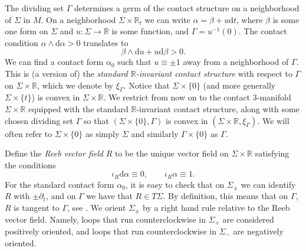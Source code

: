 \documentclass[11pt]{amsart}
\theoremstyle{mystyle}
\newcommand{\R}{\mathbb{R}}
\newcommand{\de}{\text{d}}
\newcommand{\<}{\langle}
\renewcommand{\>}{\rangle}
\begin{document}
    The dividing set $\Gamma$ determines a germ of the contact structure on a neighborhood of $\Sigma$ in $M$. On a neighborhood $\Sigma\times \R_t$ we can write $\alpha = \beta+u\de t$, where $\beta$ is some one form on $\Sigma$ and $u:\Sigma\to \R$ is some function, and $\Gamma = u^{-1}(0)$. The contact condition $\alpha \wedge \de \alpha > 0$ translates to \[\beta \wedge \de u + u \de \beta > 0.\] We can find a contact form $\alpha_0$ such that $u\equiv \pm 1$ away from a neighborhood of $\Gamma$. This is (a version of) the \textit{standard $\R$-invariant contact structure} with respect to $\Gamma$ on $\Sigma\times \R$, which we denote by $\xi_\Gamma$. Notice that $\Sigma\times \{0\}$ (and more generally $\Sigma \times \{t\}$) is convex in $\Sigma\times \R$. %
    We restrict from now on to the contact $3$-manifold $\Sigma\times \R$ equipped with the standard $\R$-invariant contact structure, along with some chosen dividing set $\Gamma$ so that $(\Sigma\times\{0\},\Gamma)$ is convex in $(\Sigma\times \R,\xi_\Gamma)$. We will often refer to $\Sigma\times \{0\}$ as simply $\Sigma$ and similarly $\Gamma\times \{0\}$ as $\Gamma$.

Define the \textit{Reeb vector field} $R$ to be the unique vector field on $\Sigma\times \R$ satisfying the conditions
\[\iota_R\de \alpha \equiv 0, \qquad \iota_R\alpha\equiv1.\]
For the standard contact form $\alpha_0$, it is easy to check that on $\Sigma_\pm$ we can identify $R$ with $\pm\partial_t$, and on $\Gamma$ we have that $R\in T\Sigma$. By definition, this means that on $\Gamma$, $R$ is tangent to $\Gamma$, see . We orient $\Sigma_\pm$ by a right hand rule relative to the Reeb vector field. Namely, loops that run counterclockwise in $\Sigma_+$ are considered positively oriented, and loops that run counterclockwise in $\Sigma_-$ are negatively oriented. 
\end{document}
